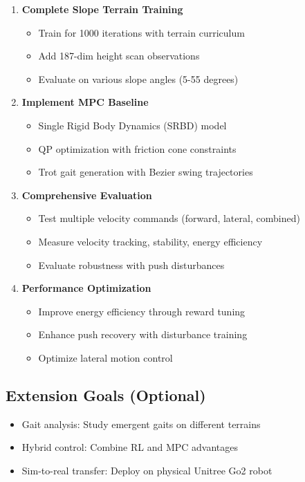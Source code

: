 \documentclass[12pt,a4paper]{article}
\begin{document}
\begin{enumerate}
    \item \textbf{Complete Slope Terrain Training}
    \begin{itemize}
        \item Train for 1000 iterations with terrain curriculum
        \item Add 187-dim height scan observations
        \item Evaluate on various slope angles (5-55 degrees)
    \end{itemize}

    \item \textbf{Implement MPC Baseline}
    \begin{itemize}
        \item Single Rigid Body Dynamics (SRBD) model
        \item QP optimization with friction cone constraints
        \item Trot gait generation with Bezier swing trajectories
    \end{itemize}

    \item \textbf{Comprehensive Evaluation}
    \begin{itemize}
        \item Test multiple velocity commands (forward, lateral, combined)
        \item Measure velocity tracking, stability, energy efficiency
        \item Evaluate robustness with push disturbances
    \end{itemize}

    \item \textbf{Performance Optimization}
    \begin{itemize}
        \item Improve energy efficiency through reward tuning
        \item Enhance push recovery with disturbance training
        \item Optimize lateral motion control
    \end{itemize}
\end{enumerate}

\subsection{Extension Goals (Optional)}

\begin{itemize}
    \item Gait analysis: Study emergent gaits on different terrains
    \item Hybrid control: Combine RL and MPC advantages
    \item Sim-to-real transfer: Deploy on physical Unitree Go2 robot
\end{itemize}
\end{document}
